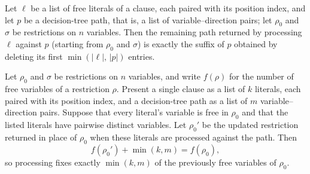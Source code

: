 \begin{lemma}
\label{SwitchingLemma.processClauseLits_fst_eq_drop}
\leanok
{}
Let $\ell$ be a list of free literals of a clause, each paired with its position index,
and let $p$ be a decision-tree path, that is, a list of variable–direction pairs; let
$\rho_0$ and $\sigma$ be restrictions on $n$ variables. Then the remaining path returned
by processing $\ell$ against $p$ (starting from $\rho_0$ and $\sigma$) is exactly the
suffix of $p$ obtained by deleting its first $\min(|\ell|,\,|p|)$ entries.
\end{lemma}

\begin{lemma}
\label{SwitchingLemma.processClauseLits_numFree_ρ_eq}
\leanok
{}
Let $\rho_0$ and $\sigma$ be restrictions on $n$ variables, and write $f(\rho)$ for the
number of free variables of a restriction $\rho$. Present a single clause as a list of
$k$ literals, each paired with its position index, and a decision-tree path as a list of
$m$ variable–direction pairs. Suppose that every literal's variable is free in $\rho_0$
and that the listed literals have pairwise distinct variables. Let $\rho_0'$ be the
updated restriction returned in place of $\rho_0$ when these literals are processed
against the path. Then
\[
f(\rho_0') + \min(k, m) = f(\rho_0),
\]
so processing fixes exactly $\min(k, m)$ of the previously free variables of $\rho_0$.
\end{lemma}

